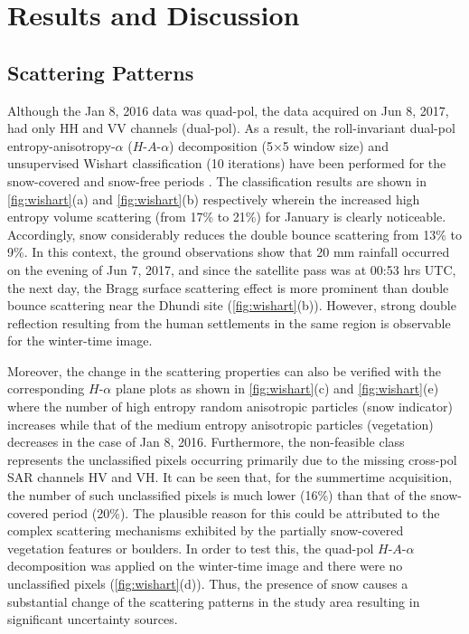 \documentclass{article}
\begin{document}
\section{Results and Discussion}
\label{sec:results}
\subsection{Scattering Patterns}
\label{ssec:scat}
Although the Jan 8, 2016 data was quad-pol, the data acquired on Jun 8, 2017, had only HH and VV channels (dual-pol). As a result, the roll-invariant dual-pol entropy-anisotropy-$\alpha$ ($H$-$A$-$\alpha$) decomposition (5$\times$5 window size) and unsupervised Wishart classification (10 iterations) have been performed for the snow-covered and snow-free periods \cite{Singh2014}. The classification results are shown in \ref{fig:wishart}(a) and \ref{fig:wishart}(b) respectively wherein the increased high entropy volume scattering (from 17\% to 21\%) for January is clearly noticeable. Accordingly, snow considerably reduces the double bounce scattering from 13\% to 9\%. In this context, the ground observations show that 20 mm rainfall occurred on the evening of Jun 7, 2017, and since the satellite pass was at 00:53 hrs UTC, the next day, the Bragg surface scattering effect is more prominent than double bounce scattering near the Dhundi site (\ref{fig:wishart}(b)). However, strong double reflection resulting from the human settlements in the same region is observable for the winter-time image.  

Moreover, the change in the scattering properties can also be verified with the corresponding $H$-$\alpha$ plane plots as shown in \ref{fig:wishart}(c) and \ref{fig:wishart}(e) where the number of high entropy random anisotropic particles (snow indicator) increases while that of the medium entropy anisotropic particles (vegetation) decreases in the case of Jan 8, 2016. Furthermore, the non-feasible class represents the unclassified pixels occurring primarily due to the missing cross-pol SAR channels HV and VH. It can be seen that, for the summertime acquisition, the number of such unclassified pixels is much lower (16\%) than that of the snow-covered period (20\%). The plausible reason for this could be attributed to the complex scattering mechanisms exhibited by the partially snow-covered vegetation features or boulders. In order to test this, the quad-pol $H$-$A$-$\alpha$ decomposition was applied on the winter-time image and there were no unclassified pixels (\ref{fig:wishart}(d)). Thus, the presence of snow causes a substantial change of the scattering patterns in the study area resulting in significant uncertainty sources.
\vspace{-1ex}
\end{document}

